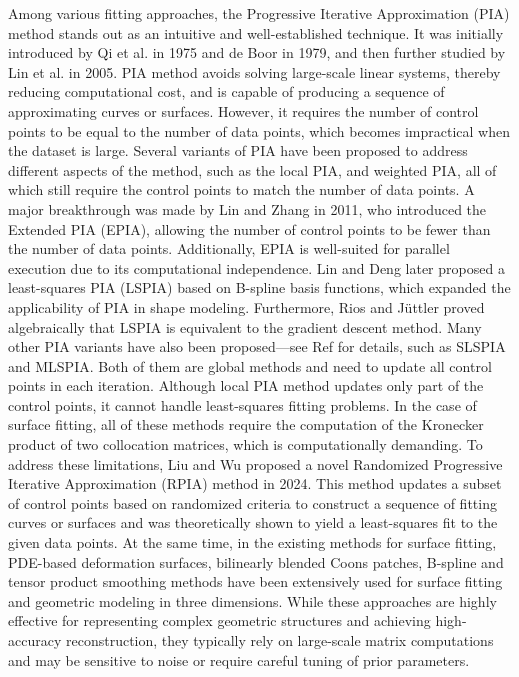 \documentclass[11pt]{article}
\numberwithin{equation}{section}
\begin{document}
Among various fitting approaches, the Progressive Iterative Approximation (PIA) method stands out as an intuitive and well-established technique. It was initially introduced by Qi et al. in 1975\cite{Qi1975} and de Boor in 1979\cite{deboor1979agee}, and then further studied by Lin et al. in 2005\cite{LIN2005575}. PIA method avoids solving large-scale linear systems, thereby reducing computational cost, and is capable of producing a sequence of approximating curves or surfaces. However, it requires the number of control points to be equal to the number of data points, which becomes impractical when the dataset is large. Several variants of PIA have been proposed to address different aspects of the method, such as the local PIA\cite{LIN2010322}, and weighted PIA\cite{LU2010129,ZHANG2018331}, all of which still require the control points to match the number of data points. A major breakthrough was made by Lin and Zhang in 2011\cite{LIN2011967}, who introduced the Extended PIA (EPIA), allowing the number of control points to be fewer than the number of data points. Additionally, EPIA is well-suited for parallel execution due to its computational independence. Lin and Deng\cite{DENG201432} later proposed a least-squares PIA (LSPIA) based on B-spline basis functions, which expanded the applicability of PIA in shape modeling. Furthermore, Rios and Jüttler\cite{RIOS2022113921} proved algebraically that LSPIA is equivalent to the gradient descent method. Many other PIA variants have also been proposed—see Ref\cite{EBRAHIMI20191,HUANG2020101931,LIU2020112389,CARNICER20102010,6035703,WU2025102439} for details, such as SLSPIA and MLSPIA. Both of them are global methods and need to update all control points in each iteration. Although local PIA method updates only part of the control points, it cannot handle least-squares fitting problems. In the case of surface fitting, all of these methods require the computation of the Kronecker product of two collocation matrices, which is computationally demanding. To address these limitations, Liu and Wu\cite{WU2024128669} proposed a novel Randomized Progressive Iterative Approximation (RPIA) method in 2024. This method updates a subset of control points based on randomized criteria to construct a sequence of fitting curves or surfaces and was theoretically shown to yield a least-squares fit to the given data points.
At the same time, in the existing methods for surface fitting, PDE-based deformation surfaces, bilinearly blended Coons patches, B-spline and tensor product smoothing methods have been extensively used for surface fitting and geometric modeling in three dimensions\cite{ZHU2024113436}. While these approaches are highly effective for representing complex geometric structures and achieving high-accuracy reconstruction, they typically rely on large-scale matrix computations and may be sensitive to noise or require careful tuning of prior parameters.
\end{document}
